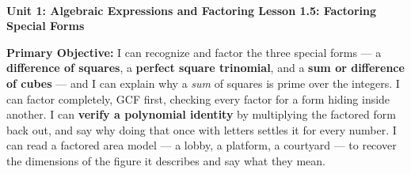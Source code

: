 \documentclass[10pt]{article}
\newcommand{\UnitNumberName}{Unit 1: Algebraic Expressions and Factoring \quad}
\newcommand{\LessonNumberName}{Lesson 1.5: Factoring Special Forms}
\begin{document}
\begin{center}
    {\Large\bfseries \CourseName \\
    {\small\bfseries \UnitNumberName \LessonNumberName}}
\end{center}

\begin{tcolorbox}[colback=mist, colframe=royal, boxrule=0.9pt, arc=2mm,
    left=2mm, right=2mm, top=1.5mm, bottom=1.5mm]
    \textbf{Primary Objective:} I can recognize and factor the three special forms --- a
    \textbf{difference of squares}, a \textbf{perfect square trinomial}, and a \textbf{sum or
    difference of cubes} --- and I can explain why a \emph{sum} of squares is prime over the
    integers. I can factor completely, GCF first, checking every factor for a form hiding inside
    another. I can \textbf{verify a polynomial identity} by multiplying the factored form back out,
    and say why doing that once with letters settles it for every number. I can read a factored area
    model --- a lobby, a platform, a courtyard --- to recover the dimensions of the figure it
    describes and say what they mean.
\end{tcolorbox}
\end{document}
